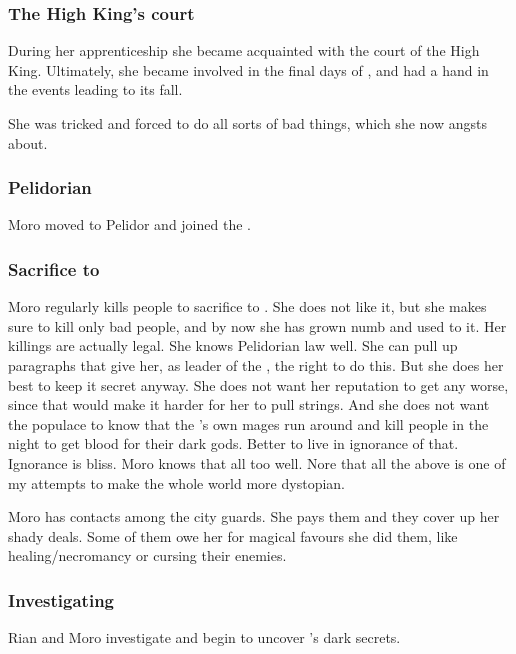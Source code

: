 \subsubsection{The High King's court}
During her apprenticeship she became acquainted with the court of the \Velcadian{} High King. Ultimately, she became involved in the final days of \GreatVelcad, and had a hand in the events leading to its fall. 

She was tricked and forced to do all sorts of bad things, which she now angsts about.





\subsubsection{Pelidorian \ishrah}
Moro moved to Pelidor and joined the \ishrah. 





\subsubsection{Sacrifice to \Nasshikerr}
Moro regularly kills people to sacrifice to .
She does not like it, but she makes sure to kill only bad people, and by now she has grown numb and used to it.
Her killings are actually legal.
She knows Pelidorian law well. 
She can pull up paragraphs that give her, as leader of the \ishrah, the right to do this.
But she does her best to keep it secret anyway.
She does not want her reputation to get any worse, since that would make it harder for her to pull strings.
And she does not want the populace to know that the \rayuth's own \ishrah mages run around and kill people in the night to get blood for their dark gods.
Better to live in ignorance of that.
Ignorance is bliss.
Moro knows that all too well.
Nore that all the above is one of my attempts to make the whole world more dystopian.

Moro has contacts among the city guards.
She pays them and they cover up her shady deals.
Some of them owe her for magical favours she did them, like healing/necromancy or cursing their enemies.





\subsubsection{Investigating \Malcur}
Rian and Moro investigate and begin to uncover \Malcur's dark secrets. 

